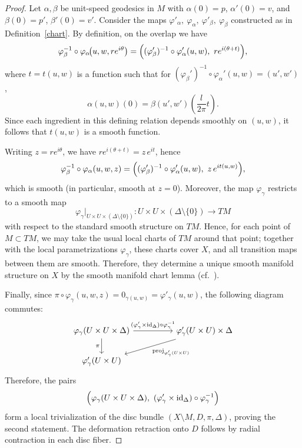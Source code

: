 \documentclass[a4paper, 12pt]{article}
\begin{document}
\begin{proof}
Let $\alpha,\beta$ be unit-speed geodesics in $M$ with $\alpha(0)=p$, $\alpha'(0)=v$, and $\beta(0)=p'$, $\beta'(0)=v'$. Consider the maps $\varphi'_\alpha,~\varphi_\alpha,~\varphi'_\beta,~\varphi_\beta$ constructed as in Definition~\ref{chart}. By definition, on the overlap we have
\[
\varphi_\beta^{-1}\circ \varphi_\alpha\!\bigl(u,w,re^{i\theta}\bigr)
=
\Bigl((\varphi_\beta')^{-1}\circ \varphi_\alpha'(u,w),\ re^{i(\theta+t)}\Bigr),
\]
where $t=t(u,w)$ is a function such that for $(\varphi_\beta')^{-1}\circ \varphi_\alpha'(u,w)=(u',w')$,
\[
\alpha(u,w)(0)=\beta(u',w')\left(\dfrac{l}{2\pi}t\right). 
\]
Since each ingredient in this defining relation depends smoothly on $(u,w)$, it follows that $t(u,w)$ is a smooth function.

Writing $z=re^{i\theta}$, we have $re^{i(\theta+t)}=z\,e^{it}$, hence
\[
\varphi_\beta^{-1}\circ \varphi_\alpha(u,w,z)
=
\Bigl((\varphi_\beta')^{-1}\circ \varphi_\alpha'(u,w),\ z\,e^{i t(u,w)}\Bigr),
\]
which is smooth (in particular, smooth at $z=0$). Moreover, the map $\varphi_\gamma$ restricts to a smooth map
\[
\varphi_\gamma\big|_{U\times U\times (\Delta\setminus\{0\})}\colon U\times U\times (\Delta\setminus\{0\})\longrightarrow TM
\]
with respect to the standard smooth structure on $TM$. Hence, for each point of $M\subset TM$, we may take the usual local charts of $TM$ around that point; together with the local parametrizations $\varphi_\gamma$, these charts cover $X$, and all transition maps between them are smooth. Therefore, they determine a unique smooth manifold structure on $X$ by the smooth manifold chart lemma (cf.~\cite[Lemma~1.35]{L03}).

Finally, since $\pi\circ\varphi_\gamma(u,w,z)=0_{\gamma(u,w)}=\varphi'_\gamma(u,w)$, the following diagram commutes:
\[
\begin{tikzcd}[column sep=huge]
\varphi_\gamma(U\times U\times \Delta)
  \arrow[r, "(\varphi'_\gamma\times \mathrm{id}_{\Delta})\circ \varphi_\gamma^{-1}"]
  \arrow[d, "\pi"']
&
\varphi'_\gamma(U\times U)\times \Delta
  \arrow[dl, "\mathrm{proj}_{\varphi'_\gamma(U\times U)}"]
\\
\varphi'_\gamma(U\times U) &
\end{tikzcd}
\]
Therefore, the pairs
\[
\Bigl(\varphi_\gamma(U\times U\times \Delta),\ (\varphi'_\gamma\times \mathrm{id}_{\Delta})\circ \varphi_\gamma^{-1}\Bigr)
\]
form a local trivialization of the disc bundle $(X\setminus M, D, \pi, \Delta)$, proving the second statement. The deformation retraction onto $D$ follows by radial contraction in each disc fiber.
\end{proof}
\end{document}
